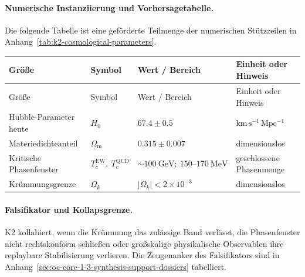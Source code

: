 \paragraph{Numerische Instanziierung und Vorhersagetabelle.}
Die folgende Tabelle ist eine geförderte Teilmenge der numerischen Stützzeilen in Anhang~\ref{tab:k2-cosmological-parameters}.
\begin{longtable}{@{}L{0.27\textwidth}L{0.15\textwidth}L{0.24\textwidth}L{0.16\textwidth}@{}}
\toprule
Größe & Symbol & Wert / Bereich & Einheit oder Hinweis \\
\midrule
\endfirsthead
\toprule
Größe & Symbol & Wert / Bereich & Einheit oder Hinweis \\
\midrule
\endhead
Hubble-Parameter heute & $\scriptstyle H_0$ & $67.4 \pm 0.5$ & $\mathrm{km\,s^{-1}\,Mpc^{-1}}$ \\
Materiedichteanteil & $\scriptstyle \Omega_{\mathrm{m}}$ & $0.315 \pm 0.007$ & dimensionslos \\
Kritische Phasenfenster & $\scriptstyle T_c^{\mathrm{EW}},\allowbreak \ T_c^{\mathrm{QCD}}$ & $\sim 100\ \mathrm{GeV};\allowbreak \ 150\text{--}170\ \mathrm{MeV}$ & geschlossene Phasenmenge \\
Krümmungsgrenze & $\scriptstyle \Omega_k$ & $|\Omega_k| < 2 \times 10^{-3}$ & dimensionslos \\
\bottomrule
\end{longtable}

\paragraph{Falsifikator und Kollapsgrenze.}
K2 kollabiert, wenn die Krümmung das zulässige Band verlässt, die Phasenfenster nicht rechtskonform schließen oder großskalige physikalische Observablen ihre replaybare Stabilisierung verlieren.
Die Zeugenanker des Falsifikators sind in Anhang~\ref{sec:oc-core-1-3-synthesis-support-dossiers} tabelliert.

